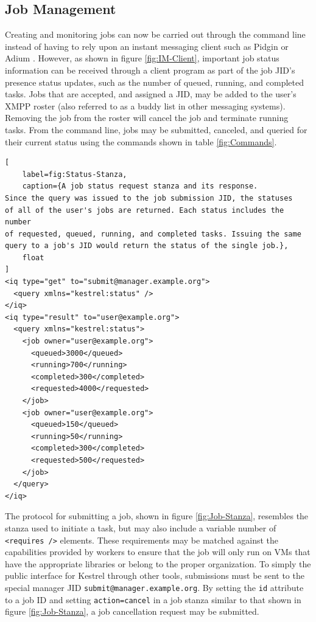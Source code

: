 \subsection{Job Management}
\label{sec:Job-Management} 
Creating and monitoring jobs can now
be carried out through the command line instead of having to rely
upon an instant messaging client such as Pidgin \cite{Pidgin} or
Adium \cite{Adium}. However, as shown in figure \ref{fig:IM-Client},
important job status information can be received through a client
program as part of the job JID's presence status updates, such as
the number of queued, running, and completed tasks. Jobs that are
accepted, and assigned a JID, may be added to the user's XMPP roster
(also referred to as a buddy list in other messaging systems). Removing
the job from the roster will cancel the job and terminate running
tasks. From the command line, jobs may be submitted, canceled, and
queried for their current status using the commands shown in table
\ref{fig:Commands}.

\begin{lstlisting}[
    label=fig:Status-Stanza,
    caption={A job status request stanza and its response.
Since the query was issued to the job submission JID, the statuses
of all of the user's jobs are returned. Each status includes the number
of requested, queued, running, and completed tasks. Issuing the same
query to a job's JID would return the status of the single job.},
    float
]
<iq type="get" to="submit@manager.example.org"> 
  <query xmlns="kestrel:status" /> 
</iq>
<iq type="result" to="user@example.org"> 
  <query xmlns="kestrel:status"> 
    <job owner="user@example.org"> 
      <queued>3000</queued> 
      <running>700</running> 
      <completed>300</completed> 
      <requested>4000</requested> 
    </job>
    <job owner="user@example.org"> 
      <queued>150</queued> 
      <running>50</running> 
      <completed>300</completed> 
      <requested>500</requested> 
    </job>
  </query> 
</iq>
\end{lstlisting}

The protocol for submitting a job, shown in figure \ref{fig:Job-Stanza},
resembles the stanza used to initiate a task, but may also include a
variable number of \texttt{<requires />} elements. These requirements may
be matched against the capabilities provided by workers to ensure that the
job will only run on VMs that have the appropriate libraries or belong
to the proper organization. To simply the public interface for Kestrel
through other tools, submissions must be sent to the special manager JID
\texttt{submit@manager.example.org}. By setting the \texttt{id} attribute to a
job ID and setting \texttt{action=cancel} in a job stanza similar to that shown
in figure \ref{fig:Job-Stanza}, a job cancellation request may be submitted.

